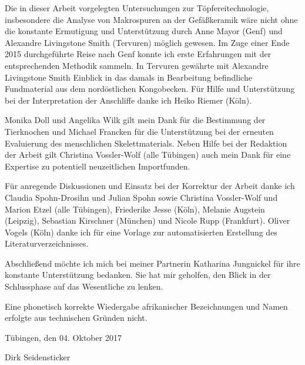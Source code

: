 Die in dieser Arbeit vorgelegten Untersuchungen zur Töpfereitechnologie, insbesondere die Analyse von Makrospuren an der Gefäßkeramik wäre nicht ohne die konstante Ermutigung und Unterstützung durch Anne Mayor (Genf) und Alexandre Livingstone Smith (Tervuren) möglich gewesen. Im Zuge einer Ende 2015 durchgeführte Reise nach Genf konnte ich erste Erfahrungen mit der entsprechenden Methodik sammeln. In Tervuren gewährte mit Alexandre Livingstone Smith Einblick in das damals in Bearbeitung befindliche Fundmaterial aus dem nordöstlichen Kongobecken. Für Hilfe und Unterstützung bei der Interpretation der Anschliffe danke ich Heiko Riemer (Köln).

Monika Doll und Angelika Wilk gilt mein Dank für die Bestimmung der Tierknochen und Michael Francken für die Unterstützung bei der erneuten Evaluierung des menschlichen Skelettmaterials. Neben Hilfe bei der Redaktion der Arbeit gilt 
Christina Vossler-Wolf (alle Tübingen) auch mein Dank für eine Expertise zu potentiell neuzeitlichen Importfunden. 
	
Für anregende Diskussionen und Einsatz bei der Korrektur der Arbeit danke ich Claudia Spohn-Drosihn und Julian Spohn sowie Christina Vossler-Wolf und Marion Etzel (alle Tübingen), Friederike Jesse (Köln), Melanie Augstein (Leipzig), Sebastian Kirschner (München) und Nicole Rupp (Frankfurt). Oliver Vogels (Köln) danke ich für eine Vorlage zur automatisierten Erstellung des Literaturverzeichnisses.

Abschließend möchte ich mich bei meiner Partnerin Katharina Jungnickel für ihre konstante Unterstützung bedanken. Sie hat mir geholfen, den Blick in der Schlussphase auf das Wesentliche zu lenken.

Eine phonetisch korrekte Wiedergabe afrikanischer Bezeichnungen und Namen erfolgte aus technischen Gründen nicht.

\vspace{2.5em}
\noindent Tübingen, den 04. Oktober 2017

\vspace{1em}
\noindent Dirk Seidensticker

\setcounter{secnumdepth}{3}		%
\setcounter{tocdepth}{3}
\tableofcontents
\cleardoublepage

